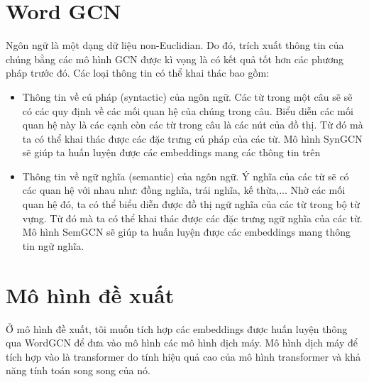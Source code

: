\section{Word GCN}
Ngôn ngữ là một dạng dữ liệu non-Euclidian. Do đó, trích xuất thông tin của chúng bằng các mô hình GCN được kì vọng là có kết quả tốt hơn các phương pháp trước đó. Các loại thông tin có thể khai thác bao gồm:
\begin{itemize}
	\item Thông tin về cú pháp (syntactic) của ngôn ngữ. Các từ trong một câu sẽ sẽ có các quy định về các mối quan hệ của chúng trong câu. Biểu diễn các mối quan hệ này là các cạnh còn các từ trong câu là các nút của đồ thị. Từ đó mà ta có thể khai thác được các đặc trưng cú pháp của các từ. Mô hình SynGCN sẽ giúp ta huấn luyện được các embeddings mang các thông tin trên
	\item Thông tin về ngữ nghĩa (semantic) của ngôn ngữ. Ý nghĩa của các từ sẽ có các quan hệ với nhau như: đồng nghĩa, trái nghĩa, kế thừa,... Nhờ các mối quan hệ đó, ta có thể biểu diễn được đồ thị ngữ nghĩa của các từ trong bộ từ vựng. Từ đó mà ta có thể khai thác được các đặc trưng ngữ nghĩa của các từ. Mô hình SemGCN sẽ giúp ta huấn luyện được các embeddings mang thông tin ngữ nghĩa.
\end{itemize}
\section{Mô hình đề xuất}

Ở mô hình đề xuất, tôi muốn tích hợp các embeddings được huấn luyện thông qua WordGCN để đưa vào mô hình các mô hình dịch máy. Mô hình dịch máy để tích hợp vào là transformer do tính hiệu quả cao của mô hình transformer và khả năng tính toán song song của nó.


